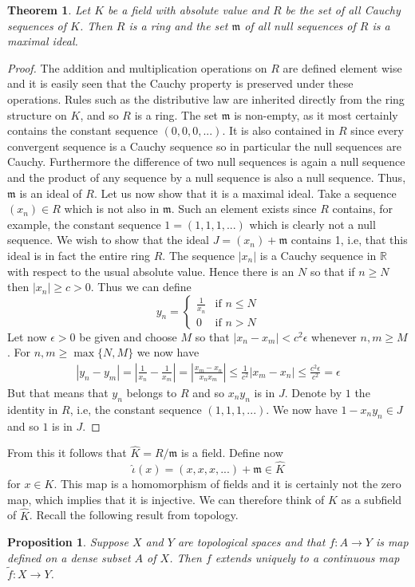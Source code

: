 \documentclass{article}
\newtheorem{theorem}{Theorem}[section]
\newtheorem{proposition}{Proposition}[section]
\newcommand{\mfrak}[1]{\mathfrak{#1}}
\newcommand{\mbb}[1]{\mathbb{#1}}
\numberwithin{equation}{section}
\begin{document}
\begin{theorem}
    Let $K$ be a field with absolute value and $R$ be the set of all Cauchy sequences of $K$. Then $R$ is a ring and the set $\mfrak m$ of all null sequences of $R$ is a maximal ideal.
\end{theorem}
\begin{proof}
    The addition and multiplication operations on $R$ are defined element wise and it is easily seen that the Cauchy property is preserved under these operations. Rules such as the distributive law are inherited directly from the ring structure on $K$, and so $R$ is a ring. The set $\mfrak m$ is non-empty, as it most certainly contains the constant sequence $(0,0,0,...)$. It is also contained in $R$ since every convergent sequence is a Cauchy sequence so in particular the null sequences are Cauchy. Furthermore the difference of two null sequences is again a null sequence and the product of any sequence by a null sequence is also a null sequence. Thus, $\mfrak m$ is an ideal of $R$. Let us now show that it is a maximal ideal. Take a sequence $(x_n) \in R$ which is not also in $\mfrak m$. Such an element exists since $R$ contains, for example, the constant sequence $1 = (1,1,1, ...)$ which is clearly not a null sequence. We wish to show that the ideal $J = (x_n) + \mfrak m$ contains 1, i.e, that this ideal is in fact the entire ring $R$. The sequence $|x_n|$ is a Cauchy sequence in $\mbb R$ with respect to the usual absolute value. Hence there is an $N$ so that if $n \geq N$ then $|x_n| \geq c > 0$. Thus we can define
    $$y_n = \begin{cases} \frac{1}{x_n} & \text{if } n \leq N \\ 0 & \text{if } n > N \end{cases}$$
    Let now $\epsilon > 0$ be given and choose $M$ so that $|x_n - x_m| < c^2 \epsilon$ whenever $n,m \geq M$. For $n,m \geq \max\{N,M\}$ we now have
    \begin{align*}
        |y_n - y_m| = |\frac{1}{x_n} - \frac{1}{x_m}| = |\frac{x_m - x_n}{x_n x_m}| \leq \frac{1}{c^2} |x_m - x_n| \leq \frac{c^2 \epsilon}{c^2} = \epsilon
    \end{align*}
    But that means that $y_n$ belongs to $R$ and so $x_n y_n$ is in $J$. Denote by $1$ the identity in $R$, i.e, the constant sequence $(1,1,1, ...)$. We now have $1 - x_n y_n \in J$ and so $1$ is in $J$.
\end{proof}

From this it follows that $\hat K = R / \mfrak m$ is a field. Define now $$\hat \iota (x) = (x,x,x,...) + \mfrak m \in \hat K$$ for $x \in K$. This map is a homomorphism of fields and it is certainly not the zero map, which implies that it is injective. We can therefore think of $K$ as a subfield of $\hat K$. Recall the following result from topology.
\begin{proposition}\label{prop: Function on a dense set}
    Suppose $X$ and $Y$ are topological spaces and that $f : A \to Y$ is map defined on a dense subset $A$ of $X$. Then $f$ extends uniquely to a continuous map $\tilde f : X \to Y$.
\end{proposition}
\end{document}
